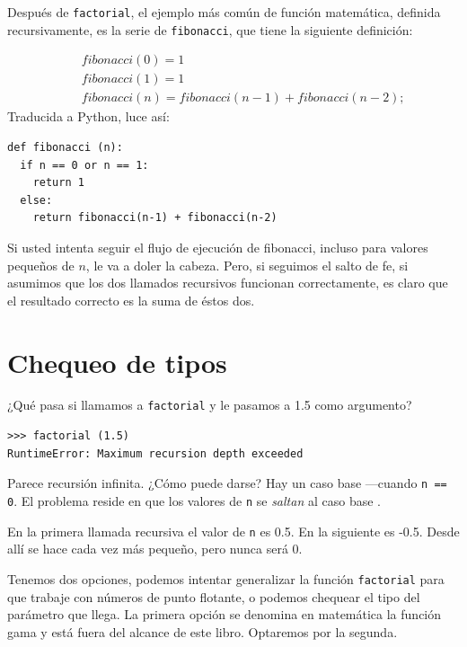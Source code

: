 
Después de  \texttt{factorial}, el ejemplo más común de  función
matemática, definida recursivamente, es la serie de  \texttt{fibonacci}, que
tiene la siguiente definición:

\vspace{-0.25in}
\begin{eqnarray*}
&& fibonacci(0) = 1 \\
&& fibonacci(1) = 1 \\
&& fibonacci(n) = fibonacci(n-1) + fibonacci(n-2);
\end{eqnarray*}
%
Traducida a Python, luce así:

\beforeverb
\begin{verbatim}
def fibonacci (n):
  if n == 0 or n == 1:
    return 1
  else:
    return fibonacci(n-1) + fibonacci(n-2)
\end{verbatim}
\afterverb
%
Si usted intenta seguir el flujo de ejecución de fibonacci, incluso
para valores pequeños de  $n$, le va a doler la cabeza. 
Pero, si seguimos el salto de fe, si asumimos que los dos
llamados recursivos funcionan correctamente, es claro que
el resultado correcto es la suma de éstos dos.


\section{Chequeo de tipos}

¿Qué pasa si llamamos a \texttt{factorial} y le pasamos a 1.5 como argumento?

\beforeverb
\begin{verbatim}
>>> factorial (1.5)
RuntimeError: Maximum recursion depth exceeded
\end{verbatim}
\afterverb
%
Parece recursión  infinita. ¿Cómo puede darse?  Hay un caso 
base ---cuando \texttt{n == 0}.  El problema reside en que
los valores de \texttt{n} se {\em saltan} al caso base .


En la primera llamada recursiva el valor de  \texttt{n} es 0.5.
En la siguiente es -0.5.  Desde allí se hace cada vez más 
pequeño, pero nunca será 0.

Tenemos dos opciones, podemos intentar generalizar la función
 \texttt{factorial} para que trabaje con números de punto flotante, o
podemos chequear el tipo del parámetro que llega. La primera opción
se denomina en matemática la función gama y está fuera del 
alcance de este libro. Optaremos por la segunda.

